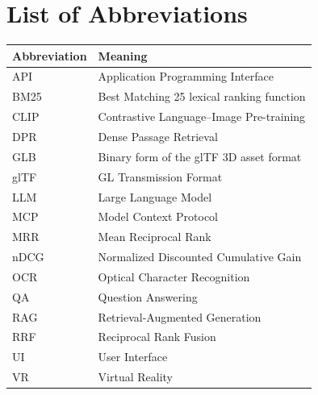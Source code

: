 \chapter*{List of Abbreviations}

\begin{longtable}{@{}L{0.20\textwidth}L{0.72\textwidth}@{}}
\toprule
Abbreviation & Meaning \\
\midrule
API & Application Programming Interface \\
BM25 & Best Matching 25 lexical ranking function \\
CLIP & Contrastive Language--Image Pre-training \\
DPR & Dense Passage Retrieval \\
GLB & Binary form of the glTF 3D asset format \\
glTF & GL Transmission Format \\
LLM & Large Language Model \\
MCP & Model Context Protocol \\
MRR & Mean Reciprocal Rank \\
nDCG & Normalized Discounted Cumulative Gain \\
OCR & Optical Character Recognition \\
QA & Question Answering \\
RAG & Retrieval-Augmented Generation \\
RRF & Reciprocal Rank Fusion \\
UI & User Interface \\
VR & Virtual Reality \\
\bottomrule
\end{longtable}
\cleardoublepage
